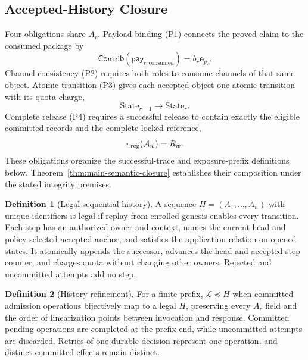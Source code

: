 \documentclass[conference,compsoc]{IEEEtran}
\theoremstyle{definition}
\newtheorem{definition}{Definition}[section]
\newtheorem{definition}{Definition}
\numberwithin{equation}{section}
\numberwithin{table}{section}
\numberwithin{figure}{section}
\theoremstyle{plain}
\begin{document}
\subsection{Accepted-History Closure}
\label{sec:boundaries}
\label{sec:prelim-goals}
\label{sec:composition-summary}

Four obligations share \(A_r\). Payload binding (P1) connects the proved claim to the consumed
package by
\begin{equation}
\mathsf{Contrib}(\mathsf{pay}_{r,\mathrm{consumed}})
  =b_r\mathbf e_{p_r}.
  \label{eq:p1}
\end{equation}
Channel consistency (P2) requires both roles to consume channels of that same object. Atomic transition (P3) gives each
accepted object one atomic transition with its quota charge,
\begin{equation}
  \mathrm{State}_{r-1}\rightarrow\mathrm{State}_{r}.
  \label{eq:p3}
\end{equation}
Complete release (P4) requires a successful release to contain exactly the eligible committed
records and the complete locked reference,
\begin{equation}
  \pi_{\rm reg}(\mathcal A_w)=R_w.
  \label{eq:p4}
\end{equation}
These obligations organize the successful-trace and exposure-prefix
definitions below. Theorem~\ref{thm:main-semantic-closure} establishes their
composition under the stated integrity premises.

\begin{definition}[Legal sequential history]
\label{def:legal-history}
A sequence \(H=(A_1,\ldots,A_n)\) with unique identifiers is legal if replay
from enrolled genesis enables every transition. Each step has an authorized
owner and context, names the current head and policy-selected accepted anchor,
and satisfies the application relation on opened states. It atomically appends
the successor, advances the head and accepted-step counter, and charges quota
without changing other owners. Rejected and uncommitted attempts add no step.
\end{definition}

\begin{definition}[History refinement]
\label{def:history-refinement}
For a finite prefix, \(\mathcal L\preceq H\) when committed admission
operations bijectively map to a legal \(H\), preserving every \(A_r\) field
and the order of linearization points between invocation and response.
Committed pending operations are completed at the prefix end, while
uncommitted attempts are discarded. Retries of one durable decision represent
one operation, and distinct committed effects remain distinct.
\end{definition}
\end{document}
